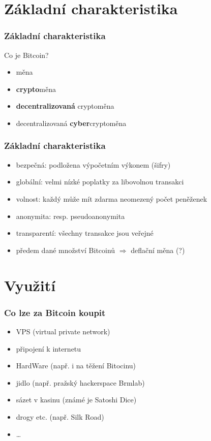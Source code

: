 \documentclass[xetex]{beamer}
\begin{document}
\section{Základní charakteristika}

\begin{frame}
	\frametitle{Základní charakteristika}

	Co je Bitcoin?
	\begin{itemize}
		\item<1-4> měna
		\item<2-4> \textbf{crypto}měna
		\item<3-4> \textbf{decentralizovaná} cryptoměna
		\item<4-4> decentralizovaná \textbf{cyber}cryptoměna
	\end{itemize}
\end{frame}

\begin{frame}
 	\frametitle{Základní charakteristika}
	\begin{itemize}
		\item bezpečná: podložena výpočetním výkonem (šifry)
		\item globální: velmi nízké poplatky za libovolnou transakci 
		\item volnost: každý může mít zdarma neomezený počet peněženek
		\item anonymita: resp. pseudoanonymita
		\item transparentí: všechny transakce jsou veřejné
		\item předem dané množství Bitcoinů $\Rightarrow$ deflační měna (?)
	\end{itemize}
\end{frame}

\section{Využití}

\begin{frame}
        \frametitle{Co lze za Bitcoin koupit}
        \begin{itemize}
                \item VPS (virtual private network)
                \item připojení k internetu
                \item HardWare (např. i na těžení Bitocinu)
		\item jidlo (např. pražský hackerspace Brmlab)
                \item sázet v kasinu (známé je Satoshi Dice)
                \item drogy etc. (např. Silk Road)
		\item \ldots{}
        \end{itemize}
\end{frame}
\end{document}
